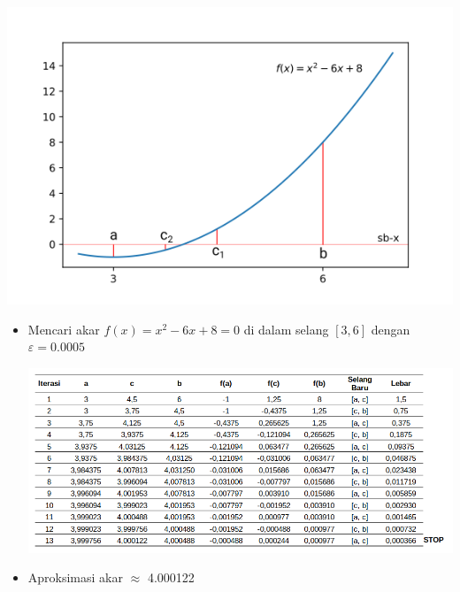 \documentclass[pdflatex,compress,mathserif]{beamer}
\begin{document}
\begin{frame}
	\begin{center}
		\includegraphics[width=\linewidth]{img/img002}
	\end{center}
\end{frame}

\begin{frame}
	\begin{itemize}
		\item Mencari akar $ f(x) = x^2 - 6x + 8 = 0 $ di dalam selang $ [3, 6] $ dengan $ \varepsilon = 0.0005 $
		
		\begin{center}
			\includegraphics[width=\linewidth]{img/tab001}
		\end{center}
		
		\item Aproksimasi akar $\approx$ 4.000122
	\end{itemize}
\end{frame}
\end{document}
